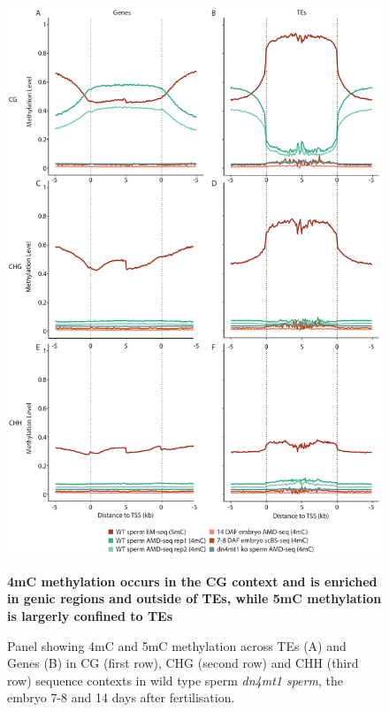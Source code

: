 \begin{figure}[htbp!] 
\centering    
    \includegraphics[width=1\textwidth]{Chapter3/Figs/Figure2_ends_analysis.pdf}
\caption{\textbf{4mC methylation occurs in the CG context and is enriched in genic regions and outside of TEs, while 5mC methylation is largerly confined to TEs}}
\label{fig:ends_analysis}
\captionsetup{font=small}
    \caption*{Panel showing 4mC and 5mC methylation across TEs (A) and Genes (B) in CG (first row), CHG (second row) and CHH (third row) sequence contexts in wild type sperm \textit{dn4mt1 sperm}, the embryo 7-8 and 14 days after fertilisation.}
\end{figure}

